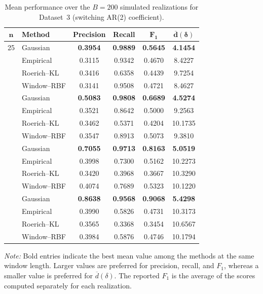 \begin{table}[!htbp]
    \centering
    \caption{Mean performance over the \(B=200\) simulated realizations for Dataset~3 (switching AR(2) coefficient).}
    \label{tab:mean_metrics_dataset3}
    \small
    \setlength{\tabcolsep}{5pt}
    \renewcommand{\arraystretch}{1.08}
    \begin{tabular}{@{}clcccc@{}}
        \toprule
        \(\boldsymbol{n}\) & \textbf{Method} & \textbf{Precision} & \textbf{Recall} & \(\boldsymbol{F_1}\) & \(\boldsymbol{\overline{d}(\delta)}\) \\
        \midrule
        25 & Gaussian & \textbf{0.3954} & \textbf{0.9889} & \textbf{0.5645} & \textbf{4.1454} \\
         & Empirical & 0.3115 & 0.9342 & 0.4670 & 8.4227 \\
         & Roerich--KL & 0.3416 & 0.6358 & 0.4439 & 9.7254 \\
         & Window--RBF & 0.3141 & 0.9508 & 0.4721 & 8.4627 \\
        \addlinespace[2pt]
        30 & Gaussian & \textbf{0.5083} & \textbf{0.9808} & \textbf{0.6689} & \textbf{4.5274} \\
         & Empirical & 0.3521 & 0.8642 & 0.5000 & 9.2563 \\
         & Roerich--KL & 0.3462 & 0.5371 & 0.4204 & 10.1735 \\
         & Window--RBF & 0.3547 & 0.8913 & 0.5073 & 9.3810 \\
        \addlinespace[2pt]
        40 & Gaussian & \textbf{0.7055} & \textbf{0.9713} & \textbf{0.8163} & \textbf{5.0519} \\
         & Empirical & 0.3998 & 0.7300 & 0.5162 & 10.2273 \\
         & Roerich--KL & 0.3420 & 0.3968 & 0.3667 & 10.3290 \\
         & Window--RBF & 0.4074 & 0.7689 & 0.5323 & 10.1220 \\
        \addlinespace[2pt]
        50 & Gaussian & \textbf{0.8638} & \textbf{0.9568} & \textbf{0.9068} & \textbf{5.4298} \\
         & Empirical & 0.3990 & 0.5826 & 0.4731 & 10.3173 \\
         & Roerich--KL & 0.3565 & 0.3368 & 0.3454 & 10.6567 \\
         & Window--RBF & 0.3984 & 0.5876 & 0.4746 & 10.1794 \\
        \bottomrule
    \end{tabular}
    \begin{flushleft}
        \footnotesize \textit{Note:} Bold entries indicate the best mean value among the methods at the same window length. Larger values are preferred for precision, recall, and \(F_1\), whereas a smaller value is preferred for \(\overline{d}(\delta)\). The reported \(F_1\) is the average of the scores computed separately for each realization.
    \end{flushleft}
\end{table}
